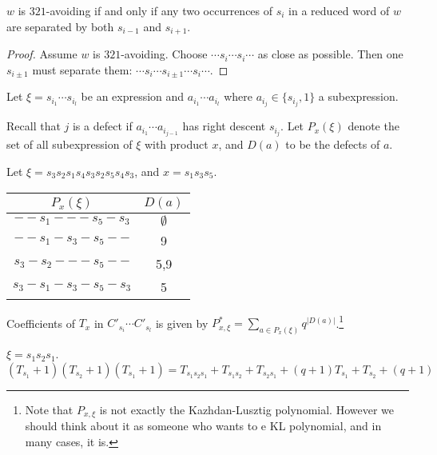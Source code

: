 \begin{lemma}
	$w$ is $321$-avoiding if and only if any two occurrences of $s_i$ in a reduced word of $w$ are separated by both $s_{i-1}$ and $s_{i+1}$.
\end{lemma}
\begin{proof}
	Assume $w$ is $321$-avoiding. Choose $\cdots s_i\cdots s_i\cdots$ as close as possible. Then one $s_{i\pm 1}$ must separate them: $\cdots s_i\cdots s_{i\pm 1}\cdots s_i\cdots$.
\end{proof}
Let $\xi=s_{i_1}\cdots s_{i_l}$ be an expression and $a_{i_1}\cdots a_{i_l}$ where $a_{i_j}\in\{s_{i_j},1\}$ a subexpression.

Recall that $j$ is a defect if $a_{i_1}\cdots a_{i_{j-1}}$ has right descent $s_{i_j}$. Let $P_x(\xi)$ denote the set of all subexpression of $\xi$ with product $x$, and $D(a)$ to be the defects of $a$.

\begin{example}
	Let $\xi=s_3s_2s_1s_4s_3s_2s_5s_4s_3$, and $x=s_1s_3s_5$.
	
	\begin{tabular}{|c|c|}
	\hline
	$P_x(\xi)$&$D(a)$\\
	\hline
	$--s_1---s_5-s_3$&$\emptyset$\\
	$--s_1-s_3-s_5--$&9\\
	$s_3-s_2---s_5--$&5,9\\
	$s_3-s_1-s_3-s_5-s_3$&5\\
	\hline
	\end{tabular}
\end{example}
\begin{theorem}[Deodhar] Coefficients of $T_x$ in $C'_{s_i}\cdots C'_{s_l}$ is given by $P_{x,\xi}^*=\sum_{a\in P_x(\xi)} q^{|D(a)|}$.\footnote{Note that $P_{x,\xi}$ is not exactly the Kazhdan-Lusztig polynomial. However we should think about it as someone who wants to e KL polynomial, and in many cases, it is.}
\end{theorem}
\begin{example}
	$\xi=s_1s_2s_1$. 
	$$(T_{s_1}+1)(T_{s_2}+1)(T_{s_1}+1)=T_{s_1s_2s_1}+T_{s_1s_2}+T_{s_2s_1} +(q+1)T_{s_1}+T_{s_2}+(q+1)
	$$
\end{example}